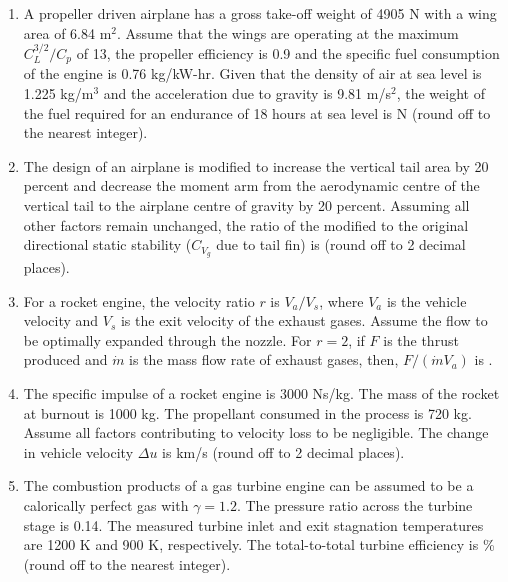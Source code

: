 \documentclass{article}
\begin{document}
\begin{enumerate}[leftmargin=*, resume]
\item A propeller driven airplane has a gross take-off weight of 4905 N with a wing area of 6.84 m\(^2\). Assume that the wings are operating at the maximum \(C_{L}^{3/2}/C_p\) of 13, the propeller efficiency is 0.9 and the specific fuel consumption of the engine is 0.76 kg/kW-hr. Given that the density of air at sea level is 1.225 kg/m\(^3\) and the acceleration due to gravity is 9.81 m/s\(^2\), the weight of the fuel required for an endurance of 18 hours at sea level is \underline{\hspace{1.5cm}} N (round off to the nearest integer).

\item The design of an airplane is modified to increase the vertical tail area by 20 percent and decrease the moment arm from the aerodynamic centre of the vertical tail to the airplane centre of gravity by 20 percent. Assuming all other factors remain unchanged, the ratio of the modified to the original directional static stability (\(C_{V_g}\) due to tail fin) is \underline{\hspace{1.5cm}} (round off to 2 decimal places).

\item For a rocket engine, the velocity ratio \(r\) is \(V_a/V_s\), where \(V_a\) is the vehicle velocity and \(V_s\) is the exit velocity of the exhaust gases. Assume the flow to be optimally expanded through the nozzle. For \(r = 2\), if \(F\) is the thrust produced and \(\dot{m}\) is the mass flow rate of exhaust gases, then, \(F/(\dot{m}V_a)\) is \underline{\hspace{1.5cm}}.

\item The specific impulse of a rocket engine is 3000 Ns/kg. The mass of the rocket at burnout is 1000 kg. The propellant consumed in the process is 720 kg. Assume all factors contributing to velocity loss to be negligible. The change in vehicle velocity \(\Delta u\) is \underline{\hspace{1.5cm}} km/s (round off to 2 decimal places).

\item The combustion products of a gas turbine engine can be assumed to be a calorically perfect gas with \(\gamma = 1.2\). The pressure ratio across the turbine stage is 0.14. The measured turbine inlet and exit stagnation temperatures are 1200 K and 900 K, respectively. The total-to-total turbine efficiency is \underline{\hspace{1.5cm}} \% (round off to the nearest integer).


\end{enumerate}
\end{document}
